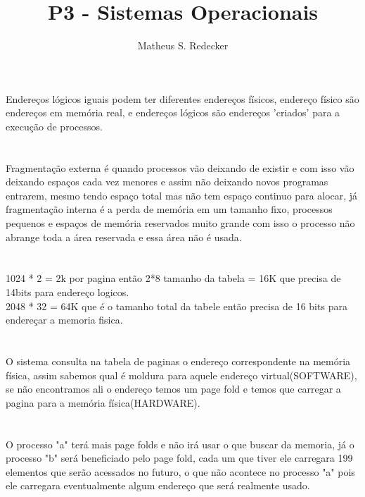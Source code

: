 \documentclass[12pt]{article}
\title{P3 - Sistemas Operacionais }
\author{Matheus S. Redecker }
\begin{document}
 

\maketitle

\section{} %
Endereços lógicos iguais podem ter diferentes endereços físicos, endereço físico são endereços em memória real, e endereços lógicos são endereços 'criados' para a execução de processos.

\section{} %
Fragmentação externa é quando processos vão deixando de existir e com isso vão deixando espaços cada vez menores e assim não deixando novos programas entrarem, mesmo tendo espaço total mas não tem espaço continuo para alocar, já fragmentação interna é a perda de memória em um tamanho fixo, processos pequenos e espaços de memória reservados muito grande com isso o processo não abrange toda a área reservada e essa área não é usada.

\section{} %
1024 * 2  = 2k por pagina então 2*8 tamanho da tabela = 16K que precisa de 14bits para endereço logicos.\\
2048 * 32 =  64K que é o tamanho total da tabele então precisa de 16 bits para endereçar a memoria fisica. 
\section{} %
O sistema consulta na tabela de paginas o endereço correspondente na memória física, assim sabemos qual é moldura para aquele endereço virtual(SOFTWARE), se não encontramos ali o endereço temos um page fold e temos que carregar a pagina para a memória física(HARDWARE).
\section{} %
O processo "a" terá mais page folds e não irá usar o que buscar da memoria, já o processo "b" será beneficiado pelo page fold, cada um que tiver ele carregara 199 elementos que serão acessados no futuro, o que não acontece no processo "a" pois ele carregara eventualmente algum endereço que será realmente usado. 
\end{document}
